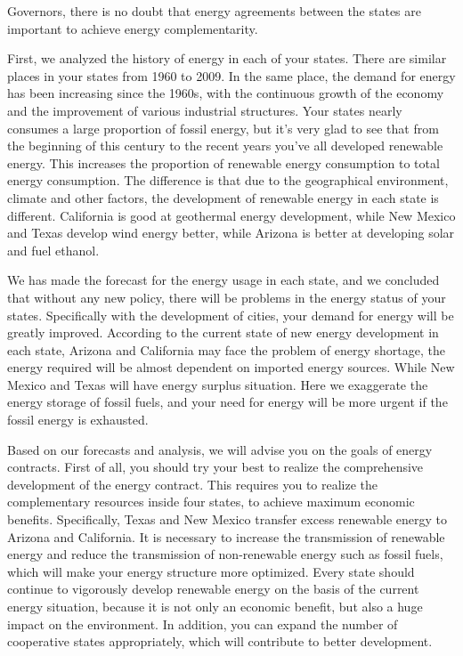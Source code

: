 \documentclass{mcmthesis}
\begin{document}
\newpage
Governors, there is no doubt that energy agreements between the states are important to achieve energy complementarity.

First, we analyzed the history of energy in each of your states. There are similar places in your states from 1960 to 2009. In the same place, the demand for energy has been increasing since the 1960s, with the continuous growth of the economy and the improvement of various industrial structures. Your states nearly consumes a large proportion of fossil energy, but it's very glad to see that from the beginning of this century to the recent years you've all developed renewable energy. This increases the proportion of renewable energy consumption to total energy consumption. 
The difference is that due to the geographical environment, climate and other factors, the development of renewable energy in each state is different. California is good at geothermal energy development, while New Mexico and Texas develop wind energy better, while Arizona is better at developing solar and fuel ethanol.

We has made the forecast for the energy usage in each state, and we concluded that without any new policy, there will be problems in the energy status of your states.
Specifically with the development of cities, your demand for energy will be greatly improved. According to the current state of new energy development in each state, Arizona and California may face the problem of energy shortage, the energy required will be almost dependent on imported energy sources. While New Mexico and Texas will have energy surplus situation.
Here we exaggerate the energy storage of fossil fuels, and your need for energy will be more urgent if the fossil energy is exhausted.

Based on our forecasts and analysis, we will advise you on the goals of energy contracts. First of all, you should try your best to realize the comprehensive development of the energy contract. This requires you to realize the complementary resources inside four states, to achieve maximum economic benefits. Specifically, Texas and New Mexico transfer excess renewable energy to Arizona and California.
It is necessary to increase the transmission of renewable energy and reduce the transmission of non-renewable energy such as fossil fuels, which will make your energy structure more optimized.
Every state should continue to vigorously develop renewable energy on the basis of the current energy situation, because it is not only an economic benefit, but also a huge impact on the environment. In addition, you can expand the number of cooperative states appropriately, which will contribute to better development.
\end{document}
